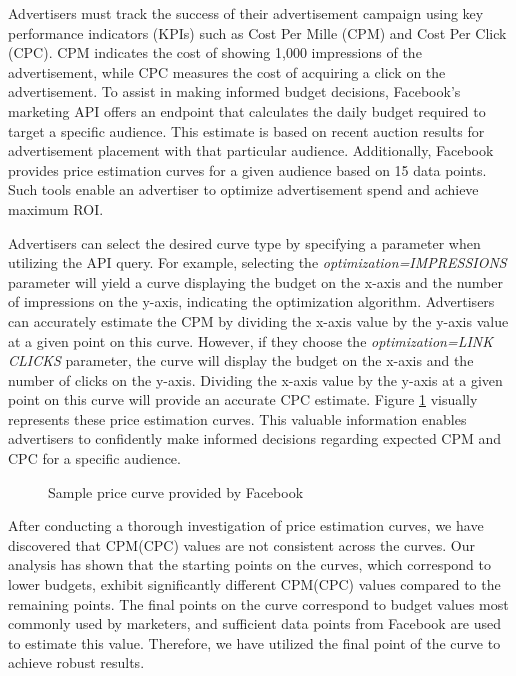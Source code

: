 \documentclass[twocolumn]{bmcart}\usepackage{lineno}
\begin{document}
Advertisers must track the success of their advertisement campaign using key performance indicators (KPIs) such as Cost Per Mille (CPM) and Cost Per Click (CPC). CPM indicates the cost of showing 1,000 impressions of the advertisement, while CPC measures the cost of acquiring a click on the advertisement. To assist in making informed budget decisions, Facebook's marketing API offers an endpoint that calculates the daily budget required to target a specific audience. This estimate is based on recent auction results for advertisement placement with that particular audience. Additionally, Facebook provides price estimation curves for a given audience based on 15 data points. Such tools enable an advertiser to optimize advertisement spend and achieve maximum ROI.

Advertisers can select the desired curve type by specifying a parameter when utilizing the API query. For example, selecting the \emph{optimization=IMPRESSIONS} parameter will yield a curve displaying the budget on the x-axis and the number of impressions on the y-axis, indicating the optimization algorithm.\color{blue} Advertisers can accurately estimate the CPM by dividing the x-axis value by the y-axis value at a given point on this curve. However, if they choose the \emph{optimization=LINK CLICKS} parameter, the curve will display the budget on the x-axis and the number of clicks on the y-axis. Dividing the x-axis value by the y-axis at a given point on this curve will provide an accurate CPC estimate. Figure \ref{fig:sampleCurve} visually represents these price estimation curves. This valuable information enables advertisers to confidently make informed decisions regarding expected CPM and CPC for a specific audience.\color{black}


\begin{figure}[h!]
    \centering
\caption{Sample price curve provided by Facebook}
    \label{fig:sampleCurve}
\end{figure}



After conducting a thorough investigation of price estimation curves, we have discovered that CPM(CPC) values are not consistent across the curves. Our analysis has shown that the starting points on the curves, which correspond to lower budgets, exhibit significantly different CPM(CPC) values compared to the remaining points. The final points on the curve correspond to budget values most commonly used by marketers, and sufficient data points from Facebook are used to estimate this value. Therefore, we have utilized the final point of the curve to achieve robust results.
\end{document}
